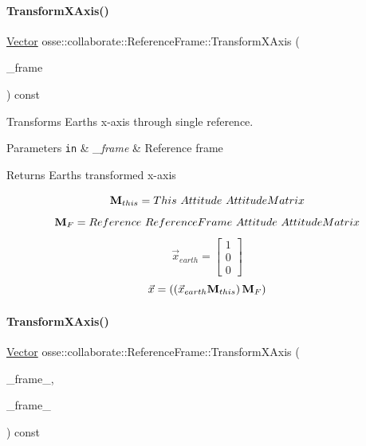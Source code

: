 \paragraph{\texorpdfstring{Transform\+X\+Axis()}{TransformXAxis()}\hspace{0.1cm}{\footnotesize\ttfamily [1/2]}}
{\footnotesize\ttfamily \hyperlink{classosse_1_1collaborate_1_1_vector}{Vector} osse\+::collaborate\+::\+Reference\+Frame\+::\+Transform\+X\+Axis (\begin{DoxyParamCaption}\item[{const \hyperlink{classosse_1_1collaborate_1_1_reference_frame}{Reference\+Frame} \&}]{\+\_\+frame }\end{DoxyParamCaption}) const\hspace{0.3cm}{\ttfamily [private]}}



Transforms Earth\textquotesingle{}s x-\/axis through single reference. 


\begin{DoxyParams}[1]{Parameters}
\mbox{\tt in}  & {\em \+\_\+frame} & Reference frame \\
\hline
\end{DoxyParams}
\begin{DoxyReturn}{Returns}
Earth\textquotesingle{}s transformed x-\/axis
\end{DoxyReturn}
\[ {\bf{M}}_{this} = This~Attitude~AttitudeMatrix \] \[ {\bf{M}}_{F} = Reference~ReferenceFrame~Attitude~AttitudeMatrix \] \[ \vec{x}_{earth} = \begin{bmatrix} 1 \\ 0 \\ 0 \end{bmatrix} \] \[ \vec{x} = \left(\left(\vec{x}_{earth}{\bf{M}}_{this}\right){\bf{M}}_{F}\right) \] \mbox{\label{classosse_1_1collaborate_1_1_reference_frame_a2172488c952b75bca793b4eca308b50b}} 
\paragraph{\texorpdfstring{Transform\+X\+Axis()}{TransformXAxis()}\hspace{0.1cm}{\footnotesize\ttfamily [2/2]}}
{\footnotesize\ttfamily \hyperlink{classosse_1_1collaborate_1_1_vector}{Vector} osse\+::collaborate\+::\+Reference\+Frame\+::\+Transform\+X\+Axis (\begin{DoxyParamCaption}\item[{const \hyperlink{classosse_1_1collaborate_1_1_reference_frame}{Reference\+Frame} \&}]{\+\_\+frame\+\_,  }\item[{const \hyperlink{classosse_1_1collaborate_1_1_reference_frame}{Reference\+Frame} \&}]{\+\_\+frame\+\_ }\end{DoxyParamCaption}) const\hspace{0.3cm}{\ttfamily [private]}}



